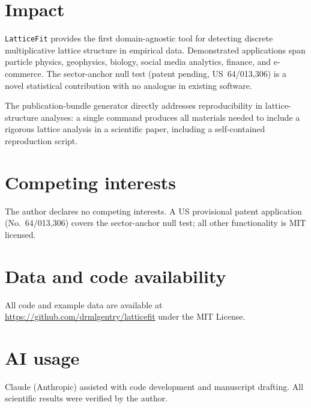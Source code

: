 \documentclass[10pt,a4paper]{article}
\begin{document}
\section{Impact}

\texttt{LatticeFit} provides the first domain-agnostic tool for
detecting discrete multiplicative lattice structure in empirical data.
Demonstrated applications span particle physics, geophysics, biology,
social media analytics, finance, and e-commerce. The sector-anchor
null test (patent pending, US~64/013,306) is a novel statistical
contribution with no analogue in existing software.

The publication-bundle generator directly addresses reproducibility
in lattice-structure analyses: a single command produces all
materials needed to include a rigorous lattice analysis in a
scientific paper, including a self-contained reproduction script.

\section*{Competing interests}
The author declares no competing interests. A US provisional patent
application (No.~64/013,306) covers the sector-anchor null test;
all other functionality is MIT licensed.

\section*{Data and code availability}
All code and example data are available at
\url{https://github.com/drmlgentry/latticefit} under the MIT License.

\section*{AI usage}
Claude (Anthropic) assisted with code development and manuscript
drafting. All scientific results were verified by the author.
\end{document}
